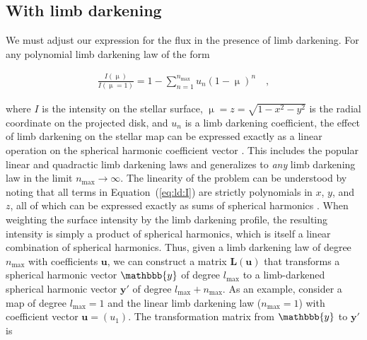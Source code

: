 \documentclass[modern,linenumbers]{aastex62}
\begin{document}
\subsection{With limb darkening}
%
\label{sec:ld}
We must adjust our expression for the flux in the presence of limb darkening.
For any polynomial limb darkening law of the form
%
\begin{linenomath}\begin{align}
        \label{eq:ld:I}
        \frac{I(\upmu)}{I(\upmu = 1)} = 1 - \sum_{n=1}^{n_\mathrm{max}} u_n(1 - \upmu)^n
        \quad,
    \end{align}\end{linenomath}
%
where $I$ is the intensity on the stellar surface,
$\upmu = z = \sqrt{1 - x^2 - y^2}$ is the radial coordinate on the
projected disk, and $u_n$ is a limb darkening coefficient, the effect of
limb darkening on the stellar map can be expressed exactly as a linear
operation on the spherical harmonic coefficient vector
\citep{Luger2019}.
This includes the popular linear and quadractic limb darkening laws
and generalizes to \emph{any} limb darkening law in the limit
$n_\mathrm{max} \rightarrow \infty$. The linearity of the problem
can be understood by noting that all terms
in Equation~(\ref{eq:ld:I}) are strictly polynomials in $x$, $y$, and $z$,
all of which can be expressed exactly as sums of spherical harmonics
\citep{Luger2019}. When weighting the surface intensity by the limb darkening
profile, the resulting intensity is simply a product of spherical harmonics,
which is itself a linear combination of spherical harmonics.
Thus, given a limb darkening law
of degree $n_\mathrm{max}$ with coefficients $\mathbf{u}$,
we can construct a matrix $\mathbf{L}(\mathbf{u})$
that transforms a spherical harmonic vector $\mathbbb{y}$ of degree
$l_\mathrm{max}$ to a limb-darkened spherical harmonic vector $\mathbf{y'}$
of degree $l_\mathrm{max} + n_\mathrm{max}$. As an example, consider
a map of degree $l_\mathrm{max} = 1$ and the linear limb darkening law
($n_\mathrm{max} = 1$) with coefficient vector $\mathbf{u} = ( u_1 )$.
The transformation matrix from $\mathbbb{y}$ to $\mathbf{y'}$ is
%
\end{document}
